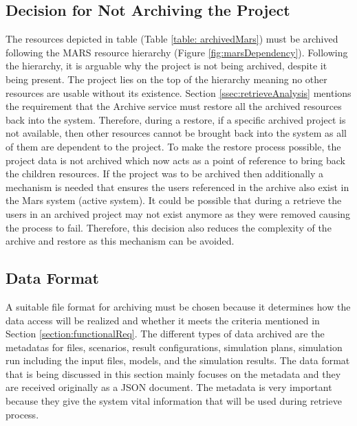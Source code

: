 \subsection{Decision for Not Archiving the Project}
The resources depicted in table (Table \ref{table: archivedMars}) must be archived following the MARS resource hierarchy (Figure \ref{fig:marsDependency}).
Following the hierarchy, it is arguable why the project is not being archived, despite it being present. The project lies on the top of the hierarchy 
meaning no other resources are usable without its existence. Section \ref{ssec:retrieveAnalysis} mentions the requirement that the Archive service must 
restore all the archived resources back into the system. Therefore, during a restore, if a specific archived project
is not available, then other resources cannot be brought back into the system as all of them are dependent to the project. To make the restore process possible,
the project data is not archived which now acts as a point of reference to bring back the children resources. 
If the project was to be archived then additionally a mechanism is needed that ensures the users referenced in the archive also exist in the Mars system (active system).
It could be possible that during a retrieve the users in an
archived project may not exist anymore as they were removed causing the process to fail. Therefore, this decision also reduces the complexity of the 
archive and restore as this mechanism can be avoided.


\subsection{Data Format}
A suitable file format for archiving must be chosen because it determines how the data access will be realized and whether it meets
the criteria mentioned in Section \ref{section:functionalReq}. The different types of data archived are the metadatas for files, scenarios, 
result configurations, simulation plans, simulation run including the input files, models, and the simulation results. 
The data format that is being discussed in this section mainly focuses on the metadata and they are received originally as a JSON document.
The metadata is very important because they give the system vital information that will be used during retrieve process. 

